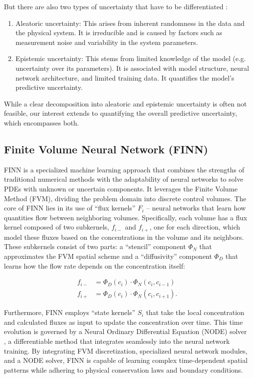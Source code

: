 But there are also two types of uncertainty that have to be differentiated \cite{depeweg2018decomposition, gawlikowski2023survey}:

\begin{enumerate}
    \item Aleatoric uncertainty: This arises from inherent randomness in the data and the physical system. It is irreducible and is caused by factors such as measurement noise and variability in the system parameters.
    \item Epistemic uncertainty: This stems from limited knowledge of the model (e.g. uncertainty over its parameters). It is associated with model structure, neural network architecture, and limited training data. It quantifies the model's predictive uncertainty.
\end{enumerate}

While a clear decomposition into aleatoric and epistemic uncertainty is often not feasible, our interest extends to quantifying the overall predictive uncertainty, which encompasses both.


\subsection{Finite Volume Neural Network (FINN)}

FINN is a specialized machine learning approach that combines the strengths of traditional numerical methods with the adaptability of neural networks to solve PDEs with unknown or uncertain components. It leverages the Finite Volume Method (FVM), dividing the problem domain into discrete control volumes. The core of FINN lies in its use of ``flux kernels'' $F_i$ – neural networks that learn how quantities flow between neighboring volumes. Specifically, each volume has a flux kernel composed of two subkernels, $f_{i-}$ and $f_{i+}$, one for each direction, which model these fluxes based on the concentrations in the volume and its neighbors. These subkernels consist of two parts: a ``stencil'' component $\Phi_N$ that approximates the FVM spatial scheme and a ``diffusivity'' component $\Phi_D$ that learns how the flow rate depends on the concentration itself:

\begin{align*}
    f_{i-} &= \Phi_D(c_i) \cdot \Phi_N(c_i, c_{i-1}) \\
    f_{i+} &= \Phi_D(c_i) \cdot \Phi_N(c_i, c_{i+1}).
\end{align*}

Furthermore, FINN employs ``state kernels'' $S_i$ that take the local concentration and calculated fluxes as input to update the concentration over time. This time evolution is governed by a Neural Ordinary Differential Equation (NODE) solver \cite{chen2019neuralordinarydifferentialequations}, a differentiable method that integrates seamlessly into the neural network training. By integrating FVM discretization, specialized neural network modules, and a NODE solver, FINN is capable of learning complex time-dependent spatial patterns while adhering to physical conservation laws and boundary conditions.



